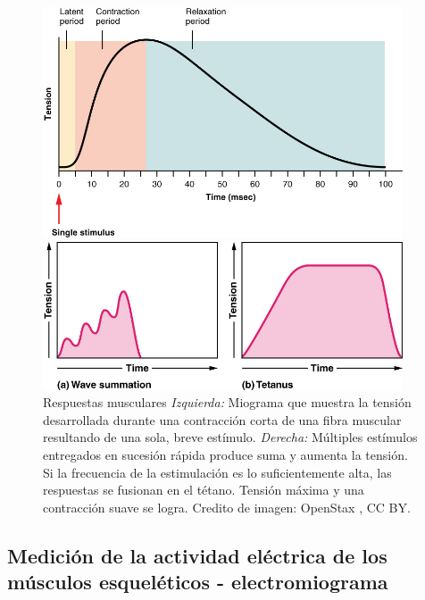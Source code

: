 \documentclass[12pt]{article}
\begin{document}
\begin{figure}[h!]
\begin{minipage}{0.45\textwidth}
\centering
\includegraphics[width=0.95\textwidth]{figures/myogram.jpg}
\end{minipage}%
\begin{minipage}{0.55\textwidth}
\centering
\includegraphics[width=0.95\textwidth]{figures/summation.jpg}
\end{minipage}
\caption{Respuestas musculares \textit {Izquierda:} Miograma que
  muestra la tensión desarrollada durante una contracción corta de una
  fibra muscular resultando de una sola, breve
  estímulo. \textit{Derecha:} Múltiples estímulos entregados en
  sucesión rápida produce suma y aumenta la tensión. Si la frecuencia
  de la estimulación es lo suficientemente alta, las respuestas se
  fusionan en el tétano. Tensión máxima y una contracción suave se
  logra. Credito de imagen: OpenStax \cite{openStax2016nervous}, CC
  BY.}
\label{fig:twitch}
\end{figure}

\subsection*{Medición de la actividad eléctrica de los músculos esqueléticos - electromiograma}
\end{document}
